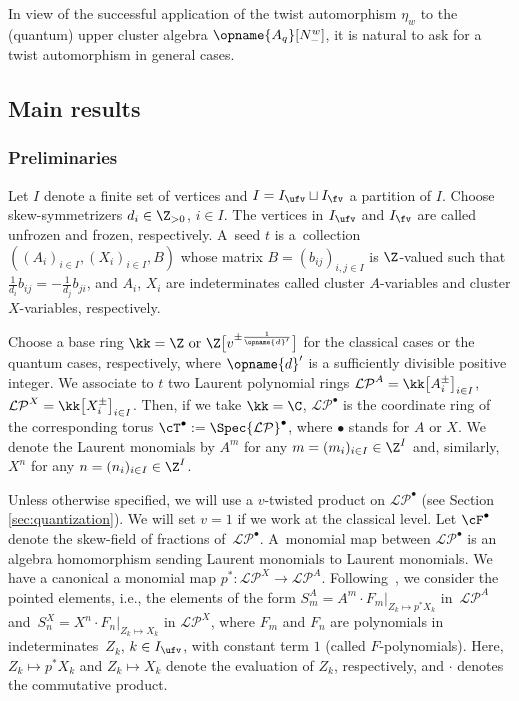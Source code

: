 \documentclass[pdftex]{sigma}
\newcommand{\Iufv}{I_{\ufv}}
\newcommand{\Ifv}{I_{\fv}}
\newcommand{\LP}{{\mathcal{LP}}}
\renewcommand{\diag}{\opname{d}'}
\newcommand{\qO}{{\opname{A_q}}}
\numberwithin{equation}{section}
\begin{document}
In view of the successful application of the twist automorphism $\eta_{w}$
to the (quantum) upper cluster algebra $\qO[N_{-}^{w}]$, it is natural
to ask for a twist automorphism in general cases.

\subsection{Main results}

\subsubsection*{Preliminaries}

Let $I$ denote a finite set of vertices and $I=I_{\ufv}\sqcup I_{\fv}$
a partition of $I$. Choose skew-symmetrizers $d_{i}\in\Z_{>0}$,
$i\in I$. The vertices in $I_{\ufv}$ and $\Ifv$ are called unfrozen
and frozen, respectively. A~seed $t$ is a~collection $((A_{i})_{i\in I},(X_{i})_{i\in I},B)$
whose matrix $B=(b_{ij})_{i,j\in I}$ is $\Z$-valued such that $\frac{1}{d_{i}}b_{ij}=-\frac{1}{d_{j}}b_{ji}$,
and $A_{i}$, $X_{i}$ are indeterminates called cluster $A$-variables
and cluster $X$-variables, respectively.

Choose a base ring $\kk=\Z\text{ or }\Z\big[v^{\pm\frac{1}{\diag}}\big]$ for the classical cases or the quantum cases, respectively, where $\diag$ is a sufficiently divisible positive integer. We associate to $t$ two Laurent polynomial rings $\LP^{A}=\kk\big[A_{i}^{\pm}\big]_{i\in I}$,
$\LP^{X}=\kk\big[X_{i}^{\pm}\big]_{i\in I}$. Then, if we take $\kk=\C$, $\LP^{\bullet}$ is the
coordinate ring of the corresponding torus $\cT^{\bullet}:=\Spec\LP^{\bullet}$,
where $\bullet$ stands for $A$ or $X$. We denote the Laurent monomials by
$A^{m}$ for any $m=(m_{i})_{i\in I}\in\Z^{I}$
and, similarly, $X^{n}$ for any $n=(n_{i})_{i\in I}\in\Z^{I}$.

Unless otherwise specified, we will use a $v$-twisted product on $\LP^\bullet$ (see Section \ref{sec:quantization}). We will set $v=1$ if we work at the classical level. Let $\cF^{\bullet}$ denote the skew-field of fractions of~$\LP^{\bullet}$. A~monomial map between $\LP^\bullet$ is an algebra
homomorphism sending Laurent monomials to Laurent monomials. We have a canonical
a monomial map $p^{*}\colon\LP^{X}\rightarrow\LP^{A}$. Following~\mbox{\cite{Qin12, qin2017triangular}}, we consider
the pointed elements, i.e., the elements of the form $S_{m}^{A}=A^{m}\cdot F_{m}|_{Z_{k}\mapsto p^{*}X_{k}}$
in~$\LP^{A}$ and~$S_{n}^{X}=X^{n}\cdot F_{n}|_{Z_{k}\mapsto X_{k}}$
in $\LP^{X}$, where $F_{m}$ and $F_{n}$ are polynomials in indeterminates~$Z_{k}$, ${k\in\Iufv}$, with constant term $1$ (called $F$-polynomials).
Here, $Z_{k}\mapsto p^{*}X_{k}$ and $Z_{k}\mapsto X_{k}$ denote
the evaluation of $Z_{k}$, respectively, and $\cdot$ denotes the commutative product.
\end{document}
